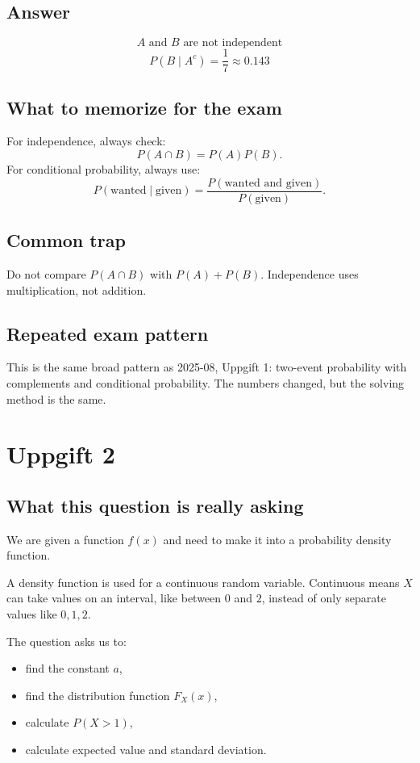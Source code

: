 \documentclass[11pt,a4paper]{article}
\begin{document}
\subsection*{Answer}
\[
\boxed{A \text{ and } B \text{ are not independent}}
\]
\[
\boxed{P(B\mid A^c)=\frac{1}{7}\approx 0.143}
\]

\subsection*{What to memorize for the exam}
For independence, always check:
\[
P(A\cap B)=P(A)P(B).
\]
For conditional probability, always use:
\[
P(\text{wanted}\mid \text{given})=
\frac{P(\text{wanted and given})}{P(\text{given})}.
\]

\subsection*{Common trap}
Do not compare \(P(A\cap B)\) with \(P(A)+P(B)\). Independence uses multiplication, not addition.

\subsection*{Repeated exam pattern}
This is the same broad pattern as 2025-08, Uppgift 1: two-event probability with complements and conditional probability. The numbers changed, but the solving method is the same.

\section*{Uppgift 2}

\subsection*{What this question is really asking}
We are given a function \(f(x)\) and need to make it into a probability density function.

A density function is used for a continuous random variable. Continuous means \(X\) can take values on an interval, like between \(0\) and \(2\), instead of only separate values like \(0,1,2\).

The question asks us to:
\begin{itemize}[leftmargin=*]
    \item find the constant \(a\),
    \item find the distribution function \(F_X(x)\),
    \item calculate \(P(X>1)\),
    \item calculate expected value and standard deviation.
\end{itemize}
\end{document}
